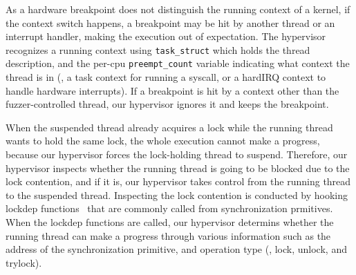 As a hardware breakpoint does not distinguish the running context of a
kernel, if the context switch happens, a breakpoint may be hit by
another thread or an interrupt handler, making the execution out of
expectation.
%
The hypervisor recognizes a running context using \texttt{task_struct}
which holds the thread description, and the per-cpu
\texttt{preempt_count} variable indicating what context the thread is
in (\eg, a task context for running a syscall, or a hardIRQ context to
handle hardware interrupts).
%
If a breakpoint is hit by a context other than the fuzzer-controlled
thread, our hypervisor ignores it and keeps the breakpoint.



When the suspended thread already acquires a lock while the running
thread wants to hold the same lock, the whole execution cannot make a
progress, because our hypervisor forces the lock-holding thread to
suspend.
%
Therefore, our hypervisor inspects whether the running thread is going
to be blocked due to the lock contention, and if it is, our hypervisor
takes control from the running thread to the suspended thread.
%
Inspecting the lock contention is conducted by hooking lockdep
functions~\cite{lockdep} that are commonly called from synchronization
prmitives.
%
When the lockdep functions are called, our hypervisor determins
whether the running thread can make a progress through various
information such as the address of the synchronization primitive, and
operation type (\ie, lock, unlock, and trylock).


